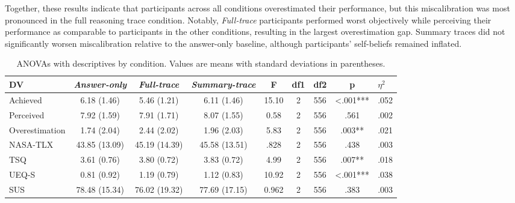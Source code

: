 \documentclass[manuscript, anonymous=false,authorversion,review=false]{acmart}
\begin{document}
Together, these results indicate that participants across all conditions overestimated their performance, but this miscalibration was most pronounced in the full reasoning trace condition. Notably, \textit{Full-trace} participants performed worst objectively while perceiving their performance as comparable to participants in the other conditions, resulting in the largest overestimation gap. Summary traces did not significantly worsen miscalibration relative to the answer-only baseline, although participants' self-beliefs remained inflated.


\begin{table}[!htp]
\centering
\caption{ANOVAs with descriptives by condition. Values are means with standard deviations in parentheses.}
\label{tab:overall_descriptives}
\begin{tabular}{lcccccccc}
\hline
DV                    & \textit{Answer-only}             & \textit{Full-trace}                 & \textit{Summary-trace} & F & df1 & df2 & p & \multicolumn{1}{l}{$\eta^2$} \\ \hline
Achieved  &    6.18 (1.46)      &      5.46 (1.21)     &       6.11 (1.46)           &       15.10           &              2        &      556                &      <.001***           &            .052         \\
Perceived &    7.92 (1.59)      &      7.91 (1.71)     &      8.07 (1.55)          &       0.58       &             2           &        556              &        .561        &           .002       \\
Overestimation &    1.74 (2.04)      &        2.44 (2.02)    &        1.96 (2.03)          &     5.83             &             2         &      556                &      .003**            &           .021           \\
NASA-TLX     & 43.85 (13.09)  & 45.19 (14.39)  & 45.58 (13.51)  &  .828 & 2 & 556 & .438 & .003  \\
TSQ                     & 3.61 (0.76)  & 3.80 (0.72)  & 3.83 (0.72)  & 4.99  & 2 & 556 & .007** & .018  \\
UEQ-S                     & 0.81 (0.92)  & 1.19 (0.79)  & 1.12 (0.83)  & 10.92  & 2 & 556 & <.001*** & .038  \\
SUS                     & 78.48 (15.34)  & 76.02 (19.32)  &  77.69 (17.15) & 0.962 & 2 & 556 & .383 & .003  \\ 

\hline
\end{tabular}




\end{table}
\end{document}
